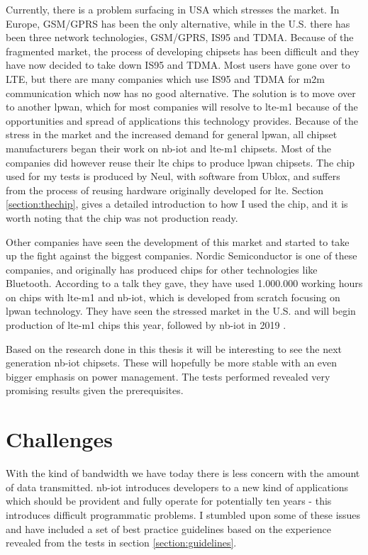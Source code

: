 \documentclass[USenglish]{ifimaster}  %
\begin{document}
Currently, there is a problem surfacing in USA which stresses the market. In Europe, GSM/GPRS has been the only alternative, while in the U.S. there has been three network technologies, GSM/GPRS, IS95 and TDMA. Because of the fragmented market, the process of developing chipsets has been difficult and they have now decided to take down IS95 and TDMA. Most users have gone over to LTE, but there are many companies which use IS95 and TDMA for \acrshort{m2m} communication which now has no good alternative. The solution is to move over to another \acrshort{lpwan}, which for most companies will resolve to \acrshort{lte-m1} because of the opportunities and spread of applications this technology provides.
Because of the stress in the market and the increased demand for general \acrshort{lpwan}, all chipset manufacturers began their work on \acrshort{nb-iot} and \acrshort{lte-m1} chipsets. Most of the companies did however reuse their \acrshort{lte} chips to produce \acrshort{lpwan} chipsets. The chip used for my tests is produced by Neul, with software from Ublox, and suffers from the process of reusing hardware originally developed for \acrshort{lte}. Section \vref{section:thechip}, gives a detailed introduction to how I used the chip, and it is worth noting that the chip was not production ready.

Other companies have seen the development of this market and started to take up the fight against the biggest companies. Nordic Semiconductor is one of these companies, and originally has produced chips for other technologies like Bluetooth. According to a talk they gave, they have used 1.000.000 working hours on chips with \acrshort{lte-m1} and \acrshort{nb-iot}, which is developed from scratch focusing on \acrshort{lpwan} technology. They have seen the stressed market in the U.S. and will begin production of \acrshort{lte-m1} chips this year, followed by \acrshort{nb-iot} in 2019 \cite{person:ola}.

Based on the research done in this thesis it will be interesting to see the next generation \acrshort{nb-iot} chipsets. These will hopefully be more stable with an even bigger emphasis on power management. The tests performed revealed very promising results given the prerequisites.

\section{Challenges} \label{section:challenges}
With the kind of bandwidth we have today there is less concern with the amount of data transmitted. \acrshort{nb-iot} introduces developers to a new kind of applications which should be provident and fully operate for potentially ten years - this introduces difficult programmatic problems. I stumbled upon some of these issues and have included a set of best practice guidelines based on the experience revealed from the tests in section \vref{section:guidelines}.
\end{document}

